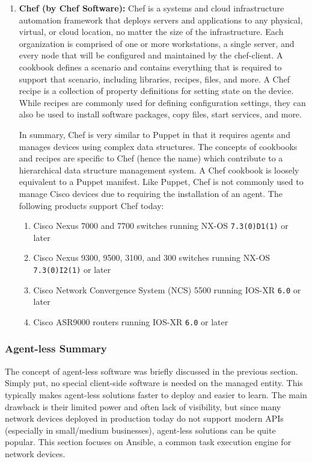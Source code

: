 \begin{enumerate}
  \item \textbf{Chef (by Chef Software):} Chef is a systems and cloud
  infrastructure automation framework that deploys servers and applications to
  any physical, virtual, or cloud location, no matter the size of the
  infrastructure. Each organization is comprised of one or more workstations,
  a single server, and every node that will be configured and maintained by
  the chef-client. A cookbook defines a scenario and contains everything that
  is required to support that scenario, including libraries, recipes, files,
  and more. A Chef recipe is a collection of property definitions for setting
  state on the device. While recipes are commonly used for defining
  configuration settings, they can also be used to install software packages,
  copy files, start services, and more.

  In summary, Chef is very similar to Puppet in that it requires agents and
  manages devices using complex data structures. The concepts of cookbooks and
  recipes are specific to Chef (hence the name) which contribute to a
  hierarchical data structure management system. A Chef cookbook is loosely
  equivalent to a Puppet manifest. Like Puppet, Chef is not commonly used to
  manage Cisco devices due to requiring the installation of an agent.
  The following products support Chef today:

  \begin{enumerate}
    \item Cisco Nexus 7000 and 7700 switches running NX-OS \verb|7.3(0)D1(1)| or later
    \item Cisco Nexus 9300, 9500, 3100, and 300 switches running NX-OS
 	\verb|7.3(0)I2(1)| or later
    \item Cisco Network Convergence System (NCS) 5500 running IOS-XR \verb|6.0| or later
    \item Cisco ASR9000 routers running IOS-XR \verb|6.0| or later
  \end{enumerate}
\end{enumerate}

\subsubsection{Agent-less Summary}
The concept of agent-less software was briefly discussed in the previous
section. Simply put, no special client-side software is needed on the managed
entity. This typically makes agent-less solutions faster to deploy and easier
to learn. The main drawback is their limited power and often lack of
visibility, but since many network devices deployed in production today do not
support modern APIs (especially in small/medium businesses), agent-less
solutions can be quite popular. This section focuses on Ansible, a common task
execution engine for network devices.

